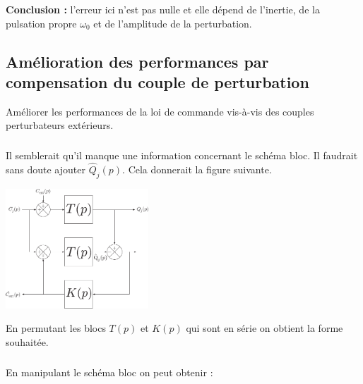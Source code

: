 \documentclass[10pt,fleqn]{article} %
\begin{document}
\textbf{Conclusion :} l'erreur ici n'est pas nulle et elle dépend de l'inertie, de la pulsation propre $\omega_0$ et de l'amplitude de la perturbation. 


\subsection{Amélioration des performances par compensation du couple de perturbation}
\begin{obj}
Améliorer les performances de la loi de commande vis-à-vis des couples perturbateurs extérieurs.
\end{obj}


\subparagraph{}%
%
%
%
%
%

\begin{remarque}
Il semblerait qu'il manque une information concernant le schéma bloc. Il faudrait sans doute ajouter $\hat{Q}_j(p)$. Cela donnerait la figure suivante.
\end{remarque}

\begin{center}
\includegraphics[width=0.4\textwidth]{images/DR_B_corrige.pdf}
\end{center}

En permutant les blocs $T(p)$ et $K(p)$ qui sont en série on obtient la forme souhaitée.
\subparagraph{}%

En manipulant le schéma bloc on peut obtenir : 
\end{document}
